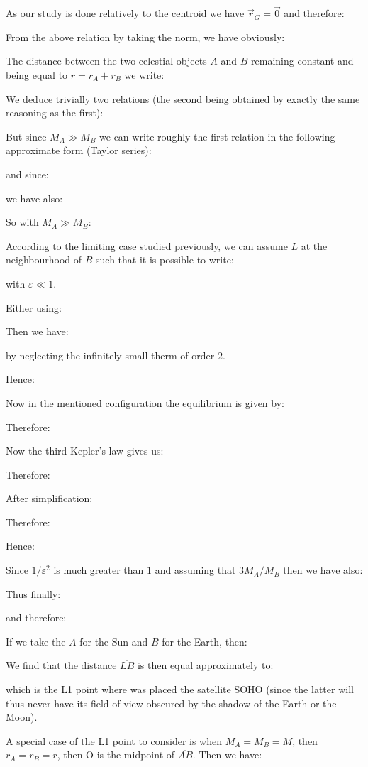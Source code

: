	As our study is done relatively to the centroid we have $\vec{r}_G=\vec{0}$ and therefore:
	
	From the above relation by taking the norm, we have obviously:
	
	The distance between the two celestial objects $A$ and $B$ remaining constant and being equal to $r=r_A+r_B$ we write:
	
	We deduce trivially two relations (the second being obtained by exactly the same reasoning as the first):
	
	But since $M_A \gg M_B$ we can write roughly the first relation in the following approximate form (Taylor series):
	
	and since:
	
	we have also:
	
	So with $M_A\gg M_B$:
	
	According to the limiting case studied previously, we can assume $L$ at the neighbourhood of $B$ such that it is possible to write:
	
	with $\varepsilon\ll 1$.
	
	Either using:
	
	Then we have:
	
	by neglecting the infinitely small therm of order $2$.

	Hence:
	
	Now in the mentioned  configuration the equilibrium is given by:
	
	Therefore:
	

	Now the third Kepler's law  gives us:
	
	Therefore:
	
	After simplification:
	
	Therefore:
	
	Hence:
	
	Since $1/\varepsilon^2$ is much greater than $1$ and assuming that $3M_A/M_B$ then we have also:
	
	Thus finally:
	
	and therefore:
	
	If we take the $A$ for the Sun and $B$ for the Earth, then:
	
	We find that the distance $\overline{LB}$ is then equal approximately to:
	
	which is the L1 point where was placed the satellite SOHO (since the latter will thus never  have its field of view obscured by the shadow of the Earth or the Moon).

	A special case of the L1 point to consider is when $M_A=M_B=M$, then $r_A=r_B=r$, then O is the midpoint of $\overline{AB}$. Then we have:
	
